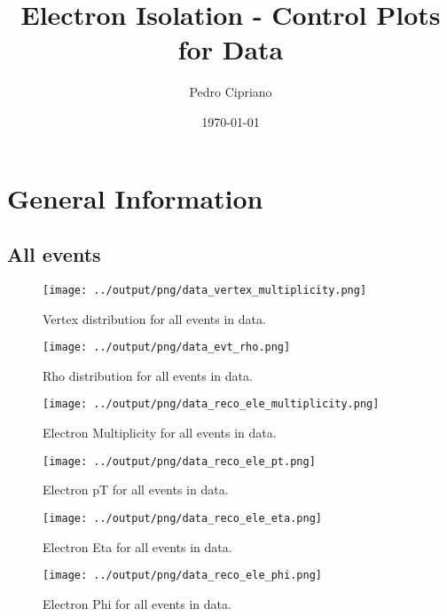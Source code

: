 \documentclass[11pt]{book}
\begin{document}
         
 
 \author{Pedro Cipriano}
 \date{\today}
 \title{Electron Isolation - Control Plots for Data}

\maketitle

\tableofcontents

\chapter{General Information}
\section{All events}

\begin{figure}[htb]
\centering
\texttt{[image: ../output/png/data\_vertex\_multiplicity.png]}
\caption{Vertex distribution for all events in data.}
\label{fig:data_vertex_multiplicity}
\end{figure}

\begin{figure}[htb]
\centering
\texttt{[image: ../output/png/data\_evt\_rho.png]}
\caption{Rho distribution for all events in data.}
\label{fig:data_evt_rho}
\end{figure}

\begin{figure}[htb]
\centering
\texttt{[image: ../output/png/data\_reco\_ele\_multiplicity.png]}
\caption{Electron Multiplicity for all events in data.}
\label{fig:data_ele_multiplicity}
\end{figure}

\begin{figure}[htb]
\centering
\texttt{[image: ../output/png/data\_reco\_ele\_pt.png]}
\caption{Electron pT for all events in data.}
\label{fig:data_ele_pt}
\end{figure}

\begin{figure}[htb]
\centering
\texttt{[image: ../output/png/data\_reco\_ele\_eta.png]}
\caption{Electron Eta for all events in data.}
\label{fig:data_ele_eta}
\end{figure}

\begin{figure}[htb]
\centering
\texttt{[image: ../output/png/data\_reco\_ele\_phi.png]}
\caption{Electron Phi for all events in data.}
\label{fig:data_ele_phi}
\end{figure}
\end{document}
